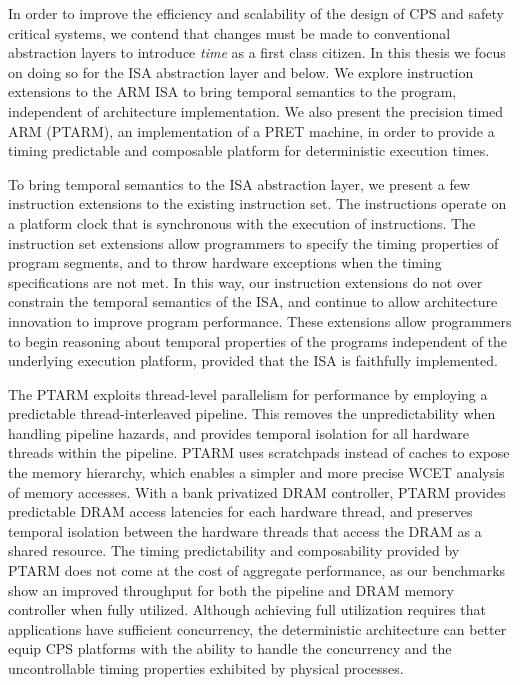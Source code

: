 In order to improve the efficiency and scalability of the design of CPS and safety critical systems, we contend that changes must be made to conventional abstraction layers to introduce \emph{time} as a first class citizen.
In this thesis we focus on doing so for the ISA abstraction layer and below.  
We explore instruction extensions to the ARM ISA to bring temporal semantics to the program, independent of architecture implementation.  
We also present the precision timed ARM (PTARM), an implementation of a PRET machine, in order to provide a timing predictable and composable platform for deterministic execution times.  

To bring temporal semantics to the ISA abstraction layer, we present a few instruction extensions to the existing instruction set. 
The instructions operate on a platform clock that is synchronous with the execution of instructions. 
The instruction set extensions allow programmers to specify the timing properties of program segments, and to throw hardware exceptions when the timing specifications are not met.
In this way, our instruction extensions do not over constrain the temporal semantics of the ISA, and continue to allow architecture innovation to improve program performance. 
These extensions allow programmers to begin reasoning about temporal properties of the programs independent of the underlying execution platform, provided that the ISA is faithfully implemented.

The PTARM exploits thread-level parallelism for performance by employing a predictable thread-interleaved pipeline. 
This removes the unpredictability when handling pipeline hazards, and provides temporal isolation for all hardware threads within the pipeline.
PTARM uses scratchpads instead of caches to expose the memory hierarchy, which enables a simpler and more precise WCET analysis of memory accesses.  
With a bank privatized DRAM controller, PTARM provides predictable DRAM access latencies for each hardware thread, and preserves temporal isolation between the hardware threads that access the DRAM as a shared resource.
The timing predictability and composability provided by PTARM does not come at the cost of aggregate performance, as our benchmarks show an improved throughput for both the pipeline and DRAM memory controller when fully utilized.  
Although achieving full utilization requires that applications have sufficient concurrency, the deterministic architecture can better equip CPS platforms with the ability to handle the concurrency and the uncontrollable timing properties exhibited by physical processes.

